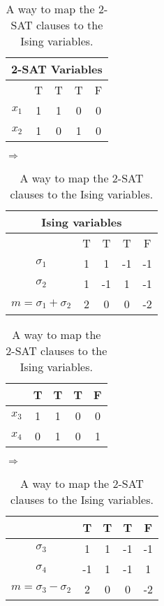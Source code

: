 \documentclass[twoside,a4paper,article]{combine}
\begin{document}
\begin{table}[h!]



\begin{center}
	\begin{tabular}{|c|c|c|c|c|}
		
		\multicolumn{5}{c}{2-SAT Variables}\\
		\hline
		  & T & T & T & F \\
		\hline
		\hline
		$x_1$ & 1 & 1 & 0 & 0 \\
		\hline
		$x_2$ & 1 & 0 & 1 & 0 \\
		\hline
	\end{tabular}
	\quad
	$\Rightarrow$
	\quad
	\begin{tabular}{|c|c|c|c|c|}
		\multicolumn{5}{c}{Ising variables}\\
		\hline
		 & T & T & T & F \\
		\hline
		\hline
		$\sigma_1$ & 1 & 1 & -1 & -1 \\
		\hline
		$\sigma_2$ & 1 & -1 & 1 & -1 \\
		\hline
		$m=\sigma_1+\sigma_2$ & 2 & 0 & 0 & -2 \\
		\hline
	\end{tabular}
\end{center}

\begin{center}
	\begin{tabular}{|c|c|c|c|c|}

		\hline
		& T & T & T & F \\
		\hline
		\hline
		$x_3$ & 1 & 1 & 0 & 0 \\
		\hline
		$x_4$ & 0 & 1 & 0 & 1 \\
		\hline
		
	\end{tabular}
		\quad
		$\Rightarrow$
		\quad
		\begin{tabular}{|c|c|c|c|c|}
			\hline
			& T & T & T & F \\
			\hline
			\hline
			$\sigma_3$ & 1 & 1 & -1 & -1 \\
			\hline
			$\sigma_4$ & -1 & 1 & -1 & 1 \\
			\hline
			$m=\sigma_3-\sigma_2$ & 2 & 0 & 0 & -2 \\
			\hline
		\end{tabular} 

\end{center}
\caption{A way to map the 2-SAT clauses to the Ising variables.}
\end{table} 
\end{document}
